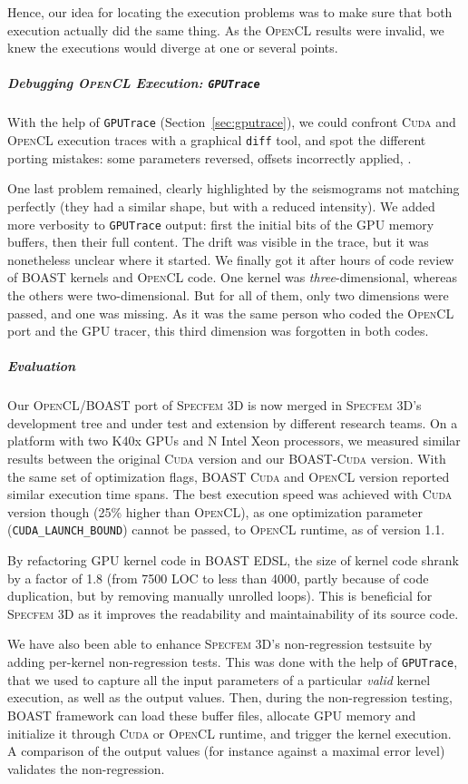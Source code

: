 \documentclass[11pt, a4paper, twoside]{montblanc}
\newcommand{\productname}[1]{\textsc{#1}}
\newcommand{\Specfem}{\productname{Specfem 3D}\xspace}
\newcommand{\Cuda}{\productname{Cuda}\xspace}
\newcommand{\OCL}{\productname{OpenCL}\xspace}
\newcommand{\code}[1]{\texttt{#1}}
\begin{document}
Hence, our idea for locating the execution problems was to make sure
that both execution actually did the same thing. As the \OCL results
were invalid, we knew the executions would diverge at one or several
points.

\subparagraph{Debugging \OCL Execution: \code{GPUTrace}} 

With the help of \code{GPUTrace} (Section~\ref{sec:gputrace}), we
could confront \Cuda and \OCL execution traces with a graphical
\code{diff} tool, and spot the different porting mistakes: some
parameters reversed, offsets incorrectly applied, \etc{}. 

One last problem remained, clearly highlighted by the seismograms not
matching perfectly (they had a similar shape, but with a reduced
intensity). We added more verbosity to \code{GPUTrace} output: first
the initial bits of the GPU memory buffers, then their full
content. The drift was visible in the trace, but it was nonetheless
unclear where it started. We finally got it after hours of code review
of BOAST kernels and \OCL code. One kernel was
\emph{three}-dimensional, whereas the others were two-dimensional. But
for all of them, only two dimensions were passed, and one was
missing. As it was the same person who coded the \OCL port and the GPU
tracer, this third dimension was forgotten in both codes.

\subparagraph{Evaluation} Our \OCL/BOAST port of \Specfem is now
merged in \Specfem's development tree and under test and extension by
different research teams. On a platform with two K40x GPUs and N Intel
Xeon processors, we measured similar results between the original
\Cuda version and our BOAST-\Cuda version. With the same set of
optimization flags, BOAST \Cuda and \OCL version reported similar
execution time spans. The best execution speed was achieved with \Cuda
version though (25\% higher than \OCL), as one optimization parameter
(\code{CUDA\_LAUNCH\_BOUND}) cannot be passed, to \OCL runtime, as of
version 1.1.

By refactoring GPU kernel code in BOAST EDSL, the size of kernel code
shrank by a factor of 1.8 (from 7500 LOC to less than 4000, partly
because of code duplication, but by removing manually unrolled
loops). This is beneficial for \Specfem as it improves the readability
and maintainability of its source code.

We have also been able to enhance \Specfem's non-regression testsuite
by adding per-kernel non-regression tests. This was done with the help
of \code{GPUTrace}, that we used to capture all the input parameters
of a particular \emph{valid} kernel execution, as well as the output
values. Then, during the non-regression testing, BOAST framework can
load these buffer files, allocate GPU memory and initialize it through
\Cuda or \OCL runtime, and trigger the kernel execution. A comparison
of the output values (for instance against a maximal error level)
validates the non-regression.
\end{document}
